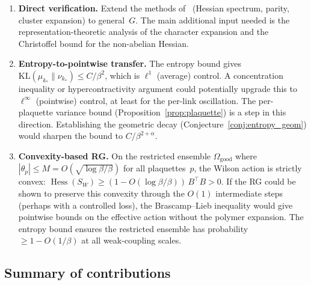 \documentclass[11pt,a4paper]{article}
\theoremstyle{plain}
\theoremstyle{definition}
\theoremstyle{remark}
\newcommand{\Hess}{\operatorname{Hess}}
\newcommand{\KL}{\mathrm{KL}}
\begin{document}
\begin{enumerate}[nosep]
  \item \textbf{Direct verification.}
    Extend the methods of~\cite{FontesSU2} (Hessian spectrum,
    parity, cluster expansion) to general~$G$.  The main
    additional input needed is the representation-theoretic
    analysis of the character expansion and the Christoffel
    bound for the non-abelian Hessian.

  \item \textbf{Entropy-to-pointwise transfer.}
    The entropy bound gives
    $\KL(\mu_{k_*} \| \nu_{k_*}) \leq C/\beta^{2}$,
    which is $\ell^1$ (average) control.
    A concentration inequality or hypercontractivity argument
    could potentially upgrade this to $\ell^\infty$
    (pointwise) control, at least for the per-link
    oscillation.  The per-plaquette variance bound
    (Proposition~\ref{prop:plaquette}) is a step in this
    direction.
    Establishing the geometric decay
    (Conjecture~\ref{conj:entropy_geom})
    would sharpen the bound to $C/\beta^{2+\alpha}$.

  \item \textbf{Convexity-based RG.}
    On the restricted ensemble $\Omega_{\mathrm{good}}$
    where $|\theta_p| \leq M = O(\sqrt{\log\beta/\beta})$
    for all plaquettes~$p$, the Wilson action is
    strictly convex: $\Hess(S_W) \geq (1 - O(\log\beta/\beta))
    \,B^\top B > 0$.  If the RG could be shown to preserve
    this convexity through the $O(1)$ intermediate steps
    (perhaps with a controlled loss), the Brascamp--Lieb
    inequality would give pointwise bounds on the effective
    action without the polymer expansion.  The entropy
    bound ensures the restricted ensemble has probability
    $\geq 1 - O(1/\beta)$ at all weak-coupling scales.
\end{enumerate}

\subsection{Summary of contributions}
\end{document}
